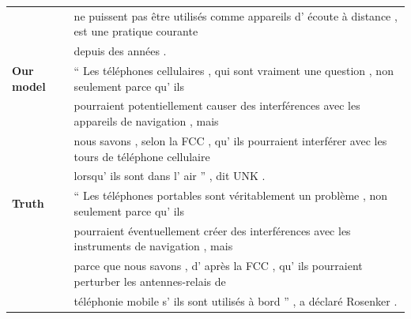 \begin{table}[ht!]
\begin{footnotesize}
\begin{tabular}{|l|l|}
& ne puissent pas \^{e}tre utilis\'{e}s comme appareils d' \'{e}coute \`{a} distance , est une pratique courante \\ 
& depuis des ann\'{e}es .\\
\hline\hline
{\bf Our model} & 
`` Les t\'{e}l\'{e}phones cellulaires , qui sont vraiment une question , non seulement parce qu' ils \\
& pourraient potentiellement causer des interf\'{e}rences avec les appareils de navigation , mais \\
& nous savons , selon la FCC , qu' ils pourraient interf\'{e}rer avec les tours de t\'{e}l\'{e}phone cellulaire \\
& lorsqu' ils sont dans l' air '' , dit UNK .\\
\hline
{\bf Truth} & 
`` Les t\'{e}l\'{e}phones portables sont v\'{e}ritablement un probl\`{e}me , non seulement parce qu' ils \\
& pourraient \'{e}ventuellement cr\'{e}er des interf\'{e}rences avec les instruments de navigation , mais \\
& parce que nous savons , d' apr\`{e}s la FCC , qu' ils pourraient perturber les antennes-relais de \\
& t\'{e}l\'{e}phonie mobile s' ils sont utilis\'{e}s \`{a} bord '' , a d\'{e}clar\'{e} Rosenker .\\

\end{tabular}
\end{footnotesize}
\end{table}
